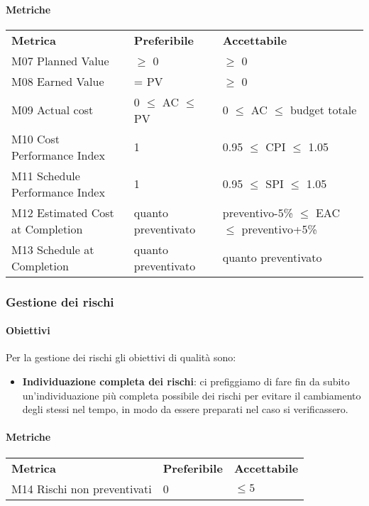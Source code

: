 			\paragraph{Metriche} \mbox{} 
			\begin{longtable} {
					>{}p{60mm} 
					>{}p{35mm}
					>{}p{50mm}
				}
				\rowcolor{gray!50}
				\textbf{Metrica} & \textbf{Preferibile} & \textbf{Accettabile} \TBstrut \TBstrut \\
				M07 Planned Value & $\ge$ 0 & $\ge$ 0 \TBstrut \\ [2mm]
				M08 Earned Value & = PV & $\ge$ 0 \TBstrut \\ [2mm]
				M09 Actual cost & 0 $\le$ AC $\le$ PV &0 $\le$ AC $\le$ budget totale \TBstrut \\ [2mm]				
				M10 Cost Performance Index & 1 & 0.95 $\le$ CPI $\le$ 1.05 \TBstrut \\ [2mm]				
				M11 Schedule Performance Index & 1 & 0.95 $\le$ SPI $\le$ 1.05 \TBstrut \\ [2mm]				
				M12 Estimated Cost at Completion & quanto preventivato & preventivo-5\% $\le$ EAC $\le$ preventivo+5\% \TBstrut \\ [2mm]
				M13 Schedule at Completion & quanto preventivato & quanto preventivato \TBstrut \\ [2mm]				
			\end{longtable}

		\subsubsection{Gestione dei rischi} 
			\paragraph{Obiettivi}
			Per la gestione dei rischi gli obiettivi di qualità sono:
			\begin{itemize}
				\item \textbf{Individuazione completa dei rischi}: ci prefiggiamo di fare fin da subito un'individuazione più completa possibile dei rischi per evitare il cambiamento degli stessi nel tempo, in modo da essere preparati nel caso si verificassero.
			\end{itemize}
			\paragraph{Metriche} \mbox{} 
			\begin{longtable} {
					>{}p{80mm} 
					>{}p{25mm}
					>{}p{25mm}
				}
				\rowcolor{gray!50}
				\textbf{Metrica} & \textbf{Preferibile} & \textbf{Accettabile} \TBstrut \TBstrut \\
				M14 Rischi non preventivati & 0 & $ \le 5$ \TBstrut \\ [2mm]
			\end{longtable}
			

